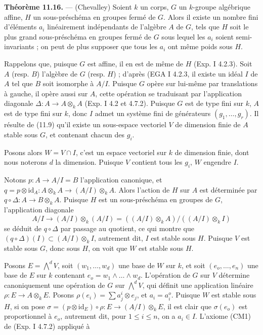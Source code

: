 \documentclass[11pt,a4paper]{article}
\begin{document}
\textbf{Théorème 11.16.} — (Chevalley) Soient $k$ un corps, $G$ un
$k$-groupe algébrique affine, $H$ un sous-préschéma en groupes fermé de
$G$. Alors il existe un nombre fini d'éléments $a_{i}$ linéairement
indépendants de l'algèbre $A$ de $G$, tels que $H$ soit le plus grand
sous-préschéma en groupes fermé de $G$ sous lequel les $a_{i}$ soient
semi-invariants ; on peut de plus supposer que tous les $a_{i}$ ont même
 poids\struck{)} sous $H$.

Rappelons que, puisque $G$ est affine, il en est de même de $H$ (Exp. I
4.2.3). Soit $A$ (resp. $B$) l'algèbre de $G$ (resp. $H$) ; d'après (EGA I
4.2.3, il existe un idéal $I$ de $A$ tel que $B$ soit isomorphe à $A/I$.
Puisque $G$ opère sur lui-même par translations à gauche, il opère aussi
sur $A$, cette opération se traduisant par l'application diagonale
$\Delta : A \longrightarrow A \otimes_{k} A$ (Exp. I 4.2 et 4.7.2).
Puisque $G$ est de type fini sur $k$, $A$ est de type fini sur $k$, donc
$I$ admet un système fini de générateurs $(g_{1}, \dots, g_{r})$. Il
résulte de (11.9) qu'il existe un sous-espace vectoriel $V$ de dimension
finie de $A$ \struck{\ill{}} stable sous $G$, et contenant chacun des
$g_{i}$.

Posons alors $W = V \cap I$, c'est un espace vectoriel sur $k$ de dimension
finie, dont nous noterons $d$ la dimension. Puisque $V$ contient tous les
$g_{i}$, $W$ engendre  $I$.

Notons $p : A \longrightarrow A/I = B$ l'application canonique, et
$q = p \otimes \mathrm{id}_{A} : A \otimes_{k} A \longrightarrow
(A/I) \otimes_{k} A$. Alors l'action de $H$ sur $A$ est déterminée par
$q \circ \Delta : A \longrightarrow B \otimes_{k} A$. Puisque $H$ est un
sous-préschéma en groupes de $G$, l'application diagonale
\[
A/I \to (A/I) \otimes_{k} (A/I)
= ((A/I) \otimes_{k} A) / ((A/I) \otimes_{k} I)
\]
se déduit de $q \circ \Delta$ par passage au quotient, ce qui montre que
$(q \circ \Delta)(I) \subset (A/I) \otimes_{k} I$, autrement dit, $I$ est
stable sous $H$. Puisque $V$ est stable sous $G$, donc sous $H$, on voit
que $W$ est stable sous $H$.

Posons $E = \bigwedge^{d} V$, soit $(w_{1}, \dots, w_{d})$ une base de $W$
sur $k$, et soit $(e_{o}, \dots, e_{n})$ une base de $E$ sur $k$ contenant
$e_{o} = w_{1} \wedge \dots \wedge w_{d}$. L'opération de $G$ sur $V$
détermine canoniquement une opération de $G$ sur $\bigwedge^{d} V$, qui
définit une application linéaire $\rho : E \to A \otimes_{k} E$. Posons
$\rho(e_{i}) = \sum a^{i}_{j} \otimes e_{j}$, et
$a_{i} = a^{o}_{i}$. Puisque $W$ est stable sous $H$, si on pose
$\sigma = (p \otimes \mathrm{id}_{E}) \circ \rho : E \longrightarrow
(A/I) \otimes_{k} E$, il est clair que $\sigma(e_{o})$ est proportionnel à
$e_{o}$, autrement dit, pour $1 \leqslant i \leqslant n$, on a
$a_{i} \in I$. L'axiome (CM1) de (Exp. I 4.7.2) appliqué à
\end{document}
